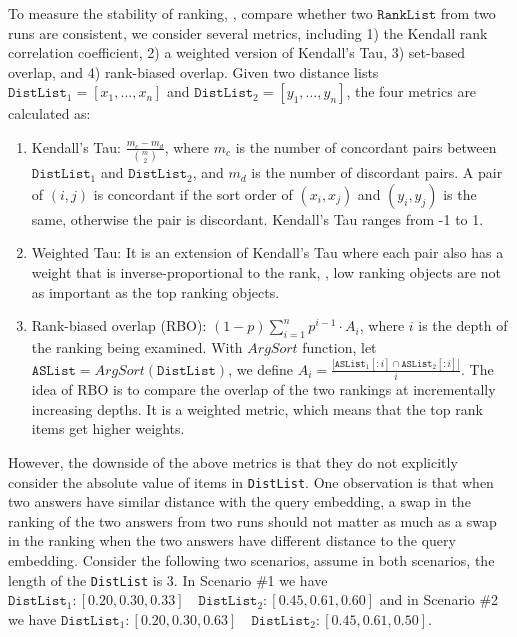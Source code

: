 To measure the stability of ranking, \ie, compare whether two $\texttt{RankList}$ from two runs are consistent, we consider several metrics, including 1) the Kendall rank correlation coefficient, 2) a weighted version of Kendall's Tau, 3) set-based overlap, and 4) rank-biased overlap. Given two distance lists $\texttt{DistList}_1=[x_1, \dots, x_n]$ and $\texttt{DistList}_2=[y_1, \dots, y_n]$, the four metrics are calculated as:
\begin{enumerate}
    \item Kendall's Tau: $\frac{m_c - m_d}{\binom{m}{2}}$, where $m_c$ is the number of concordant pairs between $\texttt{DistList}_1$ and $\texttt{DistList}_2$, and $m_d$ is the number of discordant pairs. A pair of $(i, j)$ is concordant if the sort order of $(x_i, x_j)$ and $(y_i, y_j)$ is the same, otherwise the pair is discordant. Kendall's Tau ranges from -1 to 1.
    \item Weighted Tau: It is an extension of Kendall's Tau where each pair also has a weight that is inverse-proportional to the rank, \ie, low ranking objects are not as important as the top ranking objects.
    \item Rank-biased overlap (RBO): $(1-p)\sum_{i=1}^n p^{i-1} \cdot A_i$, where $i$ is the depth of the ranking being examined. With $ArgSort$ function, let $\texttt{ASList}=ArgSort(\texttt{DistList})$, we define $A_i=\frac{|\texttt{ASList}_1[:i]\cap\texttt{ASList}_2[:i]|}{i}$. The idea of RBO is to compare the overlap of the two rankings at incrementally increasing depths. It is a weighted metric, which means that the top rank items get higher weights. 
\end{enumerate}

However, the downside of the above metrics is that they do not explicitly consider the absolute value of items in \texttt{DistList}. One observation is that when two answers have similar distance with the query embedding, a swap in the ranking of the two answers from two runs should not matter as much as a swap in the ranking when the two answers have different distance to the query embedding. Consider the following two scenarios, assume in both scenarios, the length of the \texttt{DistList} is 3. In Scenario \#1 we have $\texttt{DistList}_1: [0.20, 0.30, 0.33] \quad \texttt{DistList}_2: [0.45, 0.61, 0.60]$ and in Scenario \#2 we have $\texttt{DistList}_1: [0.20, 0.30, 0.63] \quad \texttt{DistList}_2: [0.45, 0.61, 0.50]$.

